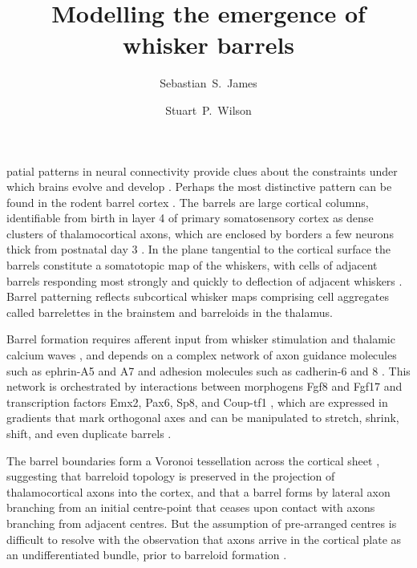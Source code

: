 \documentclass[9pt,twocolumn,twoside,lineno]{pnas-new}
\title{Modelling the emergence of whisker barrels}
\author[a,1]{Sebastian~S.~James}
\author[a]{Stuart~P.~Wilson}
\affil[a]{Department of Psychology, The University of Sheffield, Sheffield, United Kingdom.}
\begin{document}
\newcommand{\cmnt}[1]{\textcolor{blue}{#1}}
\newcommand{\dvrg}{\nabla\vcdot\nabla}
\newcommand{\e}{\emph}
\newcommand{\bol}{\textbf}
\newcommand{\mb}[1]{\mathbf{#1}}
\makeatletter
\newcommand*\vcdot{\mathpalette\vcdot@{.35}}
\newcommand*\vcdot@[2]{\mathbin{\vcenter{\hbox{\scalebox{#2}{$\m@th#1\bullet$}}}}}
\makeatother

\maketitle
\thispagestyle{firststyle}

\modulolinenumbers{}
\linenumbers

patial patterns in neural connectivity provide clues about the constraints under which brains evolve and develop \citep{purves_iterated_1992}. Perhaps the most distinctive pattern can be found in the rodent barrel cortex \cite{woolsey_structural_1970}. The barrels are large cortical columns, identifiable from birth in layer 4 of primary somatosensory cortex as dense clusters of thalamocortical axons, which are enclosed by borders a few neurons thick from postnatal day 3 \citep{erzurumlu_development_2012}. In the plane tangential to the cortical surface the barrels constitute a somatotopic map of the whiskers, with cells of adjacent barrels responding most strongly and quickly to deflection of adjacent whiskers \citep{armstrong-james_flow_1992}. Barrel patterning reflects subcortical whisker maps comprising cell aggregates called barrelettes in the brainstem and barreloids in the thalamus.

Barrel formation requires afferent input from whisker stimulation and thalamic calcium waves \citep{anton-bolanos_prenatal_2019}, and depends on a complex network of axon guidance molecules such as ephrin-A5 and A7 and adhesion molecules such as cadherin-6 and 8 \citep{vanderhaeghen_mapping_2000,miller_epha7-ephrin-a5_2006}.
This network is orchestrated by interactions between morphogens Fgf8 and Fgf17 and transcription factors Emx2, Pax6, Sp8, and Coup-tf1 \citep{shimogori_fibroblast_2005}, which are expressed in gradients that mark orthogonal axes and can be manipulated to stretch, shrink, shift, and even duplicate barrels \cite{assimacopoulos_fibroblast_2012}.

The barrel boundaries form a Voronoi tessellation across the cortical sheet \citep{senft_mouse_1991}, suggesting that barreloid topology is preserved in the projection of thalamocortical axons into the cortex, and that a barrel forms by lateral axon branching from an initial centre-point that ceases upon contact with axons branching from adjacent centres. But the assumption of pre-arranged centres is difficult to resolve with the observation that  axons arrive in the cortical plate as an undifferentiated bundle, prior to barreloid formation \cite{agmon_organized_1993}.
\end{document}

